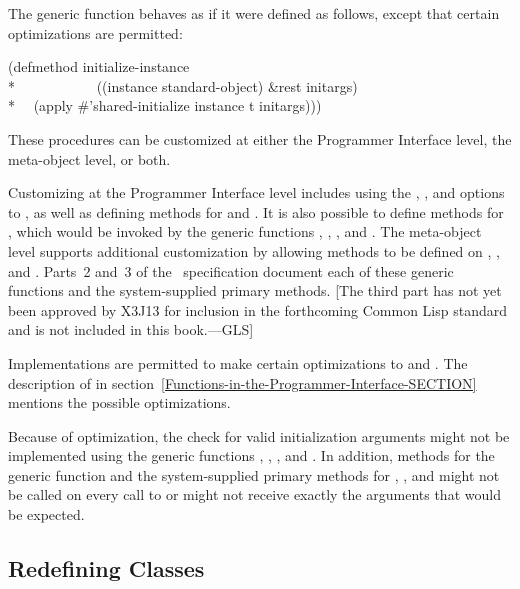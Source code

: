 The generic function  behaves as if it were
defined as follows, except that certain optimizations are permitted:

\begin{lisp}
(defmethod initialize-instance \\*
~~~~~~~~~~~((instance standard-object) \&rest initargs) \\*
~~(apply \#'shared-initialize instance t initargs)))
\end{lisp}

These procedures can be customized at either the Programmer Interface level,
the meta-object level, or both.  

Customizing at the Programmer Interface level includes using the 
, , and  options to
, as well as defining methods for 
and .  It is also possible to define
methods for , which would be invoked by the
generic functions , 
, 
, and 
.  The meta-object level supports additional
customization by allowing methods to be defined on 
, , and 
.  Parts~2 and~3 of the \CLOS\ specification document each of these generic
functions and the system-supplied primary methods.
[The third part
has not yet been approved by X3J13 for inclusion in the forthcoming
Common Lisp standard and is not included in this book.---GLS]

Implementations are permitted to make certain optimizations to 
 and .  The
description of  in
section~\ref{Functions-in-the-Programmer-Interface-SECTION}
mentions the
possible optimizations.

Because of optimization, the check for valid initialization arguments
might not be implemented using the generic functions 
, , 
, and . In addition,
methods for the generic function  and the
system-supplied primary methods for , 
,
and  might not be called on
every call to  or might not receive exactly the
arguments that would be expected.

\subsection{Redefining Classes}
\label{Redefining-Classes-SECTION}

